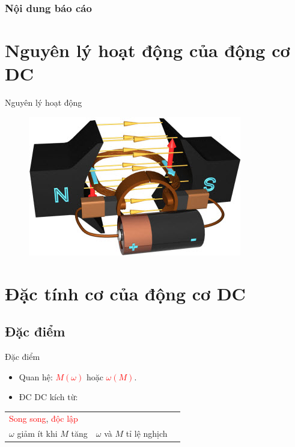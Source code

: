 \documentclass[24pt]{beamer}
\newcommand{\noibat}[1]{\textcolor{red}{#1}}
\begin{document}
\begin	{frame}	%
	\frametitle{Nội dung báo cáo}
	\tableofcontents
\end{frame}

\section[Nguyên lý hoạt động]{Nguyên lý hoạt động của động cơ DC}
\begin{frame}{Nguyên lý hoạt động}
	\begin{figure}[!h]
		\begin{center}
			\href{run:video-mophong/Motor-DC.mp4}{\includegraphics[scale=.8]{video-mophong/Motor-DC.jpg}}
		\end{center}
	\end{figure} 
\end{frame}

\section{Đặc tính cơ của động cơ DC}
\subsection*{Đặc điểm}
\begin{frame}{Đặc điểm}
	\justifying
	\begin{itemize}
		\item Quan hệ: \noibat{$M(\omega)$} hoặc \noibat{$\omega(M)$}.

		\item ĐC DC kích từ:
	\end{itemize}
			\begin{tabular}{|m{6.5cm}|m{4.5cm}|l}\cline{1-2}		
			\noibat{Song song}, \noibat{độc lập} & \centering{\noibat{Nối tiếp}} & \\ \cline{1-2}
			$\omega$ giảm ít khi $M$ tăng & $\omega$ và $M$ tỉ lệ nghịch & \\ \cline{1-2}
			\end{tabular}
\end{frame}
\end{document}
